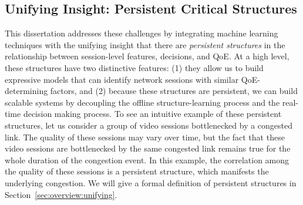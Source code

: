 \subsection{Unifying Insight: Persistent Critical Structures}
This dissertation addresses these challenges by integrating 
machine learning techniques with
the unifying insight that there are {\em persistent structures} in the relationship
between session-level features, decisions, and QoE.
At a high level, these structures have two distinctive features:
(1) they allow us to build expressive models that can identify network 
sessions with similar QoE-determining factors, and 
(2) because these structures are persistent, we can 
build scalable systems by decoupling the offline structure-learning 
process and the real-time decision making process.
To see an intuitive example of these persistent structures, let us consider 
a group of video sessions bottlenecked by a congested link.
The quality of these sessions may vary over time, but the fact
that these video sessions are bottlenecked by the same congested link remains true 
for the whole duration of the congestion event.
In this example, the correlation among the quality of these sessions 
is a persistent structure, which manifests the underlying congestion.
We will give a formal definition of persistent structures in
Section~\ref{sec:overview:unifying}.





%
%
%
%

